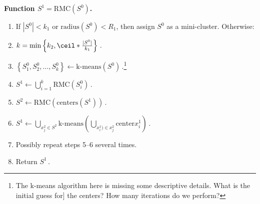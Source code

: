 \documentclass{article} %
\begin{document}
{\bf Function $S^1 = \text{RMC}(S^0)$.}
\begin{enumerate}
    \item If $|S^0| < k_1$ or $\text{radius}(S^0) < R_1$, then assign $S^0$ as  a mini-cluster. Otherwise:
    \item $k = \min\left\{k_2, \ceil*{\frac{|S^0|}{k_1}} \right\}\,.$
    \item $\left\{S^0_1,S^0_2,\dots,S^0_k\right\} \longleftarrow \text{k-means}\left(S^0\right)\,.$\footnote{The k-means algorithm here is missing some descriptive details. What is the initial guess for] the centers? How many iterations do we perform?}
    \item $S^1 \longleftarrow \bigcup_{i=1}^k \text{RMC}\left(S^0_i\right)\,.$
    \item $S^2 \longleftarrow \text{RMC}\left(\text{centers}\left(S^1\right)\right)\,.$
    \item $S^1 \longleftarrow \bigcup_{x_j^2 \in S^2} \text{k-means}\left(\bigcup_{x_i^1) \in x^2_j} \text{center}x_i^1 \right)\,.$
    \item Possibly repeat steps 5--6 several times.
    \item Return $S^1$\,.
\end{enumerate}
\end{document}

